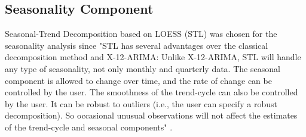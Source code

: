 \documentclass[conference, letterpaper]{IEEEtran}
\begin{document}
\subsection{Seasonality Component}
Seasonal-Trend Decomposition based on LOESS (STL) \cite{STL} was chosen for the seasonality analysis since "STL has several advantages over the classical decomposition method and X-12-ARIMA: Unlike X-12-ARIMA, STL will handle any type of seasonality, not only monthly and quarterly data. 
The seasonal component is allowed to change over time, and the rate of change can be controlled by the user. 
The smoothness of the trend-cycle can also be controlled by the user. It can be robust to outliers (i.e., the user can specify a robust decomposition). 
So occasional unusual observations will not affect the estimates of the trend-cycle and seasonal components" \cite{forecasting}.\\
\end{document}
